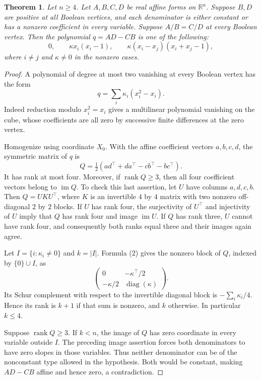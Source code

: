 \documentclass[11pt]{article}
\newtheorem{theorem}{Theorem}
\begin{document}
\begin{theorem}
Let $n\geq4$. Let $A,B,C,D$ be real affine forms on $\mathbb R^n$.
Suppose $B,D$ are positive at all Boolean vertices, and each denominator
is either constant or has a nonzero coefficient in every variable.
Suppose $A/B=C/D$ at every Boolean vertex. Then the polynomial
$q=AD-CB$ is one of the following:
\[
 0,\qquad \kappa x_i(x_i-1),\qquad
 \kappa(x_i-x_j)(x_i+x_j-1),
 \tag{1}
\]
where $i\neq j$ and $\kappa\neq0$ in the nonzero cases.
\end{theorem}
\begin{proof}
A polynomial of degree at most two vanishing at every Boolean vertex
has the form
\[
 q=\sum_i\kappa_i(x_i^2-x_i).
 \tag{2}
\]
Indeed reduction modulo $x_i^2=x_i$ gives a multilinear polynomial
vanishing on the cube, whose coefficients are all zero by successive
finite differences at the zero vertex.

Homogenize using coordinate $X_0$. With the affine coefficient vectors
$a,b,c,d$, the symmetric matrix of $q$ is
\[
 Q=\tfrac12(ad^\top+da^\top-cb^\top-bc^\top).
\]
It has rank at most four. Moreover, if $\operatorname{rank}Q\geq3$,
then all four coefficient vectors belong to $\operatorname{im}Q$.
To check this last assertion, let $U$ have columns $a,d,c,b$. Then
$Q=UKU^\top$, where $K$ is an invertible $4$ by $4$ matrix with two
nonzero off-diagonal $2$ by $2$ blocks. If $U$ has rank four, the
surjectivity of $U^\top$ and injectivity of $U$ imply that $Q$ has
rank four and image $\operatorname{im}U$. If $Q$ has rank three,
$U$ cannot have rank four, and consequently both ranks equal three
and their images again agree.

Let $I=\{i:\kappa_i\neq0\}$ and $k=|I|$. Formula (2) gives the
nonzero block of $Q$, indexed by $\{0\}\cup I$, as
\[
 \begin{pmatrix}0&-\kappa^\top/2\\
                 -\kappa/2&\operatorname{diag}(\kappa)\end{pmatrix}.
\]
Its Schur complement with respect to the invertible diagonal block is
$-\sum_i\kappa_i/4$. Hence its rank is $k+1$ if that sum is nonzero,
and $k$ otherwise. In particular $k\leq4$.

Suppose $\operatorname{rank}Q\geq3$. If $k<n$, the image of $Q$
has zero coordinate in every variable outside $I$. The preceding
image assertion forces both denominators to have zero slopes in those
variables. Thus neither denominator can be of the nonconstant type
allowed in the hypothesis. Both would be constant, making $AD-CB$
affine and hence zero, a contradiction.


\end{proof}
\end{document}
